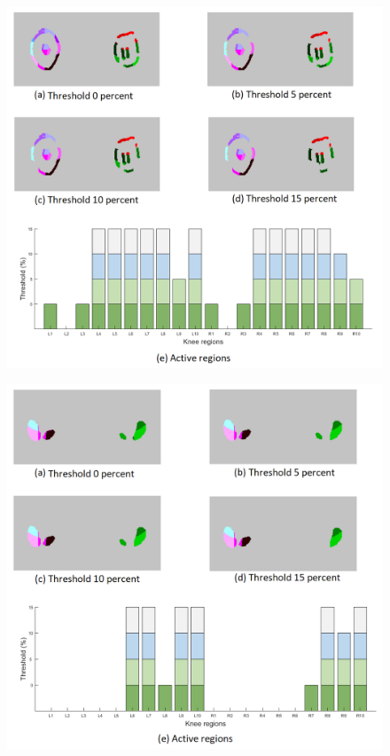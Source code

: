 \begin{figure} [H]
\centering
\includegraphics[width=1\textwidth]{figures/threshold52}
\end{figure}

\begin{figure} [H]
\centering
\includegraphics[width=1\textwidth]{figures/threshold67}
\end{figure}

